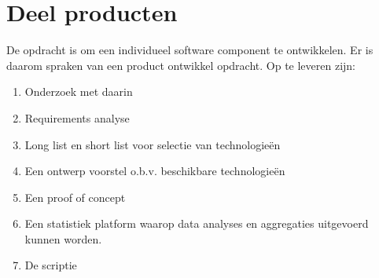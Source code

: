 \section{Deel producten}

De opdracht is om een individueel software component te ontwikkelen. Er is daarom spraken van een product ontwikkel opdracht. Op te leveren zijn:

\begin{enumerate}
    \item Onderzoek met daarin
    \item Requirements analyse
    \item Long list en short list voor selectie van technologieën
    \item Een ontwerp voorstel o.b.v. beschikbare technologieën
    \item Een proof of concept
    \item Een statistiek platform waarop data analyses en aggregaties uitgevoerd kunnen worden.
    \item De scriptie
\end{enumerate}



